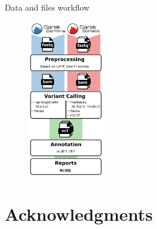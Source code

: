 \documentclass[usepdftitle=false]{beamer}
\begin{document}
\begin{frame}{Data and files workflow}
	\begin{figure}
		\includegraphics[height=7cm]{pictures/Sarek_2-2_workflow}
	\end{figure}
\end{frame}

\section{Acknowledgments}
\end{document}
